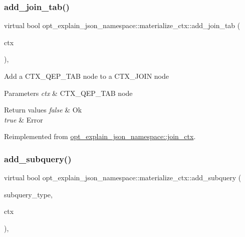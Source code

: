 \subsubsection{\texorpdfstring{add\+\_\+join\+\_\+tab()}{add\_join\_tab()}}
{\footnotesize\ttfamily virtual bool opt\+\_\+explain\+\_\+json\+\_\+namespace\+::materialize\+\_\+ctx\+::add\+\_\+join\+\_\+tab (\begin{DoxyParamCaption}\item[{\mbox{\hyperlink{classopt__explain__json__namespace_1_1joinable__ctx}{joinable\+\_\+ctx}} $\ast$}]{ctx }\end{DoxyParamCaption})\hspace{0.3cm}{\ttfamily [inline]}, {\ttfamily [virtual]}}

Add a C\+T\+X\+\_\+\+Q\+E\+P\+\_\+\+T\+AB node to a C\+T\+X\+\_\+\+J\+O\+IN node


\begin{DoxyParams}{Parameters}
{\em ctx} & C\+T\+X\+\_\+\+Q\+E\+P\+\_\+\+T\+AB node\\
\hline
\end{DoxyParams}

\begin{DoxyRetVals}{Return values}
{\em false} & Ok \\
\hline
{\em true} & Error \\
\hline
\end{DoxyRetVals}


Reimplemented from \mbox{\hyperlink{classopt__explain__json__namespace_1_1join__ctx_a2eec52e554d339b5f45630e7f8cf5d41}{opt\+\_\+explain\+\_\+json\+\_\+namespace\+::join\+\_\+ctx}}.

\mbox{\label{classopt__explain__json__namespace_1_1materialize__ctx_adcc1a9841e17f5abf74faf8d719d9700}} 
\subsubsection{\texorpdfstring{add\+\_\+subquery()}{add\_subquery()}}
{\footnotesize\ttfamily virtual bool opt\+\_\+explain\+\_\+json\+\_\+namespace\+::materialize\+\_\+ctx\+::add\+\_\+subquery (\begin{DoxyParamCaption}\item[{subquery\+\_\+list\+\_\+enum}]{subquery\+\_\+type,  }\item[{\mbox{\hyperlink{classopt__explain__json__namespace_1_1subquery__ctx}{subquery\+\_\+ctx}} $\ast$}]{ctx }\end{DoxyParamCaption})\hspace{0.3cm}{\ttfamily [inline]}, {\ttfamily [virtual]}}

